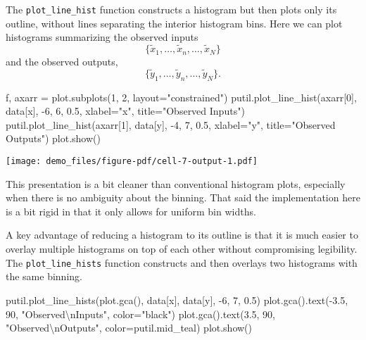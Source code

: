 \documentclass[
  letterpaper,
  DIV=11,
  numbers=noendperiod]{scrartcl}
\newenvironment{Shaded}{\begin{snugshade}}{\end{snugshade}}
\newcommand{\CharTok}[1]{\textcolor[rgb]{0.13,0.47,0.30}{#1}}
\newcommand{\DecValTok}[1]{\textcolor[rgb]{0.68,0.00,0.00}{#1}}
\newcommand{\FloatTok}[1]{\textcolor[rgb]{0.68,0.00,0.00}{#1}}
\newcommand{\NormalTok}[1]{\textcolor[rgb]{0.00,0.23,0.31}{#1}}
\newcommand{\OperatorTok}[1]{\textcolor[rgb]{0.37,0.37,0.37}{#1}}
\newcommand{\StringTok}[1]{\textcolor[rgb]{0.13,0.47,0.30}{#1}}
\begin{document}
The \texttt{plot\_line\_hist} function constructs a histogram but then
plots only its outline, without lines separating the interior histogram
bins. Here we can plot histograms summarizing the observed inputs \[
\{ \tilde{x}_{1}, \ldots, \tilde{x}_{n}, \ldots, \tilde{x}_{N} \}
\] and the observed outputs, \[
\{ \tilde{y}_{1}, \ldots, \tilde{y}_{n}, \ldots, \tilde{y}_{N} \}.
\]

\begin{Shaded}
\begin{Highlighting}[]
\NormalTok{f, axarr }\OperatorTok{=}\NormalTok{ plot.subplots(}\DecValTok{1}\NormalTok{, }\DecValTok{2}\NormalTok{, layout}\OperatorTok{=}\StringTok{"constrained"}\NormalTok{)}
\NormalTok{putil.plot\_line\_hist(axarr[}\DecValTok{0}\NormalTok{], data[}\StringTok{\textquotesingle{}x\textquotesingle{}}\NormalTok{], }\OperatorTok{{-}}\DecValTok{6}\NormalTok{, }\DecValTok{6}\NormalTok{, }\FloatTok{0.5}\NormalTok{,}
\NormalTok{                     xlabel}\OperatorTok{=}\StringTok{"x"}\NormalTok{, title}\OperatorTok{=}\StringTok{"Observed Inputs"}\NormalTok{)}
\NormalTok{putil.plot\_line\_hist(axarr[}\DecValTok{1}\NormalTok{], data[}\StringTok{\textquotesingle{}y\textquotesingle{}}\NormalTok{], }\OperatorTok{{-}}\DecValTok{4}\NormalTok{, }\DecValTok{7}\NormalTok{, }\FloatTok{0.5}\NormalTok{,}
\NormalTok{                     xlabel}\OperatorTok{=}\StringTok{"y"}\NormalTok{, title}\OperatorTok{=}\StringTok{"Observed Outputs"}\NormalTok{)}
\NormalTok{plot.show()}
\end{Highlighting}
\end{Shaded}

\texttt{[image: demo\_files/figure-pdf/cell-7-output-1.pdf]}

This presentation is a bit cleaner than conventional histogram plots,
especially when there is no ambiguity about the binning. That said the
implementation here is a bit rigid in that it only allows for uniform
bin widths.

A key advantage of reducing a histogram to its outline is that it is
much easier to overlay multiple histograms on top of each other without
compromising legibility. The \texttt{plot\_line\_hists} function
constructs and then overlays two histograms with the same binning.

\begin{Shaded}
\begin{Highlighting}[]
\NormalTok{putil.plot\_line\_hists(plot.gca(), data[}\StringTok{\textquotesingle{}x\textquotesingle{}}\NormalTok{], data[}\StringTok{\textquotesingle{}y\textquotesingle{}}\NormalTok{], }\OperatorTok{{-}}\DecValTok{6}\NormalTok{, }\DecValTok{7}\NormalTok{, }\FloatTok{0.5}\NormalTok{)}
\NormalTok{plot.gca().text(}\OperatorTok{{-}}\FloatTok{3.5}\NormalTok{, }\DecValTok{90}\NormalTok{, }\StringTok{"Observed}\CharTok{\textbackslash{}n}\StringTok{Inputs"}\NormalTok{, color}\OperatorTok{=}\StringTok{"black"}\NormalTok{)}
\NormalTok{plot.gca().text(}\FloatTok{3.5}\NormalTok{, }\DecValTok{90}\NormalTok{, }\StringTok{"Observed}\CharTok{\textbackslash{}n}\StringTok{Outputs"}\NormalTok{, color}\OperatorTok{=}\NormalTok{putil.mid\_teal)}
\NormalTok{plot.show()}
\end{Highlighting}
\end{Shaded}
\end{document}
